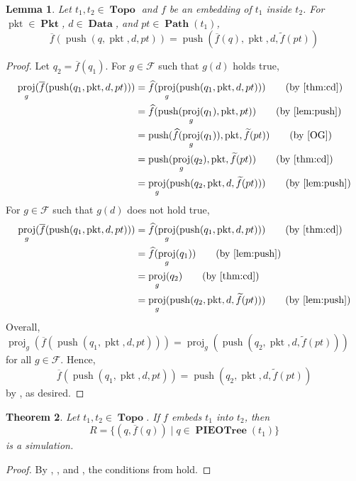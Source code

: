 \documentclass{amsart}
\DeclareMathOperator{\pkt}{\mathrm{pkt}}
\DeclareMathOperator{\push}{\mathrm{push}}
\DeclareMathOperator{\proj}{\mathrm{proj}}
\DeclareMathOperator{\Pkt}{\mathbf{Pkt}}
\DeclareMathOperator{\Data}{\mathbf{Data}}
\DeclareMathOperator{\Topo}{\mathbf{Topo}}
\DeclareMathOperator{\Path}{\mathbf{Path}}
\DeclareMathOperator{\PIEOTree}{\mathbf{PIEOTree}}
\newtheorem{thm}{Theorem}[section]
\newtheorem{lem}[thm]{Lemma}
\theoremstyle{definition}
\begin{document}
\begin{lem}
    \label{lem:sim3}
    Let $t_1, t_2 \in \Topo$ and $f$ be an embedding of $t_1$ inside $t_2$. 
    For $\pkt \in \Pkt$, $d \in \Data$, and $pt \in \Path(t_1)$,
    $$\overline{f}(\push(q, \pkt, d, pt)) = \push(\overline{f}(q), \pkt, d, \widetilde{f}(pt))$$
\end{lem}

\begin{proof}
    Let $q_2 = \overline{f}(q_1)$.
    For $g \in \mathcal F$ such that $g(d)$ holds true,
    \begin{align*}
        \proj_g(\overline{f}(\push(q_1, \pkt, d, pt)))
        &= \widehat{f}(\proj_g(\push(q_1, \pkt, d, pt))) \tag{by \Cref{thm:cd}}\\
        &= \widehat{f}(\push(\proj_g(q_1), \pkt, pt)) \tag{by \Cref{lem:push}}\\
        &= \push(\widehat{f}(\proj_g(q_1)), \pkt, \widetilde{f}(pt)) \tag{by \cite[Lemma ~5.9]{OG}}\\
        &= \push(\proj_g(q_2), \pkt, \widetilde{f}(pt)) \tag{by \Cref{thm:cd}}\\
        &= \proj_g(\push(q_2, \pkt, d, \widetilde{f}(pt))) \tag{by \Cref{lem:push}}
    \end{align*}
    For $g \in \mathcal F$ such that $g(d)$ does not hold true,
    \begin{align*}
        \proj_g(\overline{f}(\push(q_1, \pkt, d, pt)))
        &= \widehat{f}(\proj_g(\push(q_1, \pkt, d, pt))) \tag{by \Cref{thm:cd}}\\
        &= \widehat{f}(\proj_g(q_1)) \tag{by \Cref{lem:push}}\\
        &= \proj_g(q_2) \tag{by \Cref{thm:cd}}\\
        &= \proj_g(\push(q_2, \pkt, d, \widetilde{f}(pt))) \tag{by \Cref{lem:push}}
    \end{align*}
    Overall,
    $
        \proj_g(\overline{f}(\push(q_1, \pkt, d, pt)))
        = 
        \proj_g(\push(q_2, \pkt, d, \widetilde{f}(pt)))
    $
    for all $g \in \mathcal F$. 
    Hence,
    $$
        \overline{f}(\push(q_1, \pkt, d, pt))
        = 
        \push(q_2, \pkt, d, \widetilde{f}(pt))
    $$
    by , as desired.
\end{proof}

\begin{thm}
    Let $t_1, t_2 \in \Topo$. If $f$ embeds $t_1$ into $t_2$, then 
    $$R = \{(q, \overline{f}(q)) \mid q \in \PIEOTree(t_1)\}$$ 
    is a simulation.
\end{thm}

\begin{proof}
    By , , and , the conditions from  hold.
\end{proof}

\newpage 

\renewcommand\refname{\LARGE References}


\end{document}
